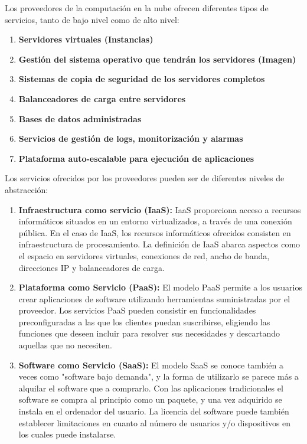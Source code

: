 Los proveedores de la computación en la nube ofrecen diferentes tipos de servicios, tanto de bajo nivel como de alto nivel:

\begin{enumerate}
     \item \textbf{Servidores virtuales (Instancias)}
    \item \textbf{Gestión del sistema operativo que tendrán los servidores (Imagen)}
    \item \textbf{Sistemas de copia de seguridad de los servidores completos }
    \item \textbf{Balanceadores de carga entre servidores}
    \item \textbf{Bases de datos administradas }
    \item \textbf{Servicios de gestión de logs, monitorización y alarmas}
    \item \textbf{Plataforma auto-escalable para ejecución de aplicaciones}
\end{enumerate}

Los servicios ofrecidos por los proveedores pueden ser de diferentes niveles de abstracción:

\begin{enumerate}
     \item \textbf{Infraestructura como servicio (IaaS): } IaaS proporciona acceso a recursos informáticos situados en un entorno virtualizados, a través de una conexión pública. En el caso de IaaS, los recursos informáticos ofrecidos consisten en infraestructura de procesamiento. La definición de IaaS abarca aspectos como el espacio en servidores virtuales, conexiones de red, ancho de banda, direcciones IP y balanceadores de carga.
    \item \textbf{Plataforma como Servicio (PaaS): }El modelo PaaS permite a los usuarios crear aplicaciones de software utilizando herramientas suministradas por el proveedor. Los servicios PaaS pueden consistir en funcionalidades preconfiguradas a las que los clientes puedan suscribirse, eligiendo las funciones que deseen incluir para resolver sus necesidades y descartando aquellas que no necesiten.
    \item \textbf{Software como Servicio (SaaS): } El modelo SaaS se conoce también a veces como "software bajo demanda", y la forma de utilizarlo se parece más a alquilar el software que a comprarlo. Con las aplicaciones tradicionales el software se compra al principio como un paquete, y una vez adquirido se instala en el ordenador del usuario. La licencia del software puede también establecer limitaciones en cuanto al número de usuarios y/o dispositivos en los cuales puede instalarse.

\end{enumerate}

